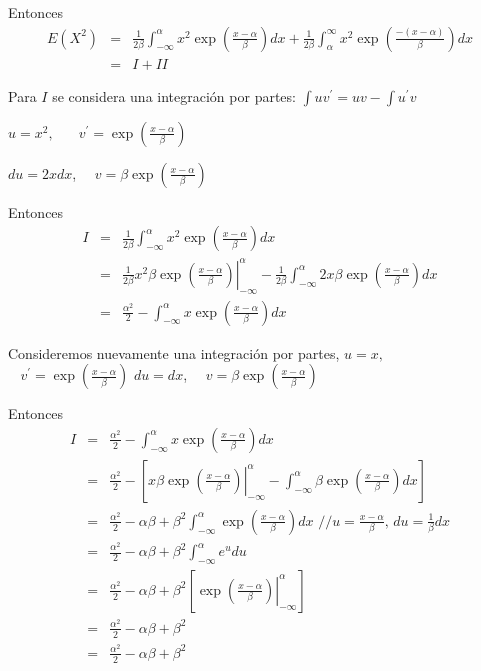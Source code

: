 \begin{i}
Entonces
\begin{eqnarray*}
E(X^{2}) &=&\frac{1}{2\beta }\int_{-\infty }^{\alpha }x^{2}\exp \left( \frac{
x-\alpha }{\beta }\right) dx+\frac{1}{2\beta }\int_{\alpha }^{\infty
}x^{2}\exp \left( \frac{-(x-\alpha )}{\beta }\right) dx \\
&=&I+II
\end{eqnarray*}

Para $I$ se considera una integración por partes: $\int uv^{\prime}=uv-\int u^{\prime }v$

$u=x^{2},$ \ $\ \ \ \ v^{\prime }=\exp \left( \frac{x-\alpha }{\beta}\right) $

$du=2xdx$, \ \ $v=\beta \exp \left( \frac{x-\alpha }{\beta }\right) $

Entonces 
\begin{eqnarray*}
I &=&\frac{1}{2\beta }\int_{-\infty }^{\alpha }x^{2}\exp \left( \frac{
x-\alpha }{\beta }\right) dx \\
&=&\left. \frac{1}{2\beta }x^{2}\beta \exp \left( \frac{x-\alpha }{\beta }
\right) \right\vert _{-\infty }^{\alpha }-\frac{1}{2\beta }\int_{-\infty
}^{\alpha }2x\beta \exp \left( \frac{x-\alpha }{\beta }\right) dx \\
&=&\frac{\alpha ^{2}}{2}-\int_{-\infty }^{\alpha }x\exp \left( \frac{
x-\alpha }{\beta }\right) dx\text{ \ }
\end{eqnarray*}

Consideremos nuevamente una integración por partes,
$u=x,$ \ $\ \ \ \ v^{\prime }=\exp \left( \frac{x-\alpha }{\beta }\right) $
$du=dx$, \ \ $v=\beta \exp \left( \frac{x-\alpha }{\beta }\right) $

Entonces
\begin{eqnarray*}
I &=&\frac{\alpha ^{2}}{2}-\int_{-\infty }^{\alpha }x\exp \left( \frac{
x-\alpha }{\beta }\right) dx\text{ \ } \\
&=&\frac{\alpha ^{2}}{2}-\left[ \left. x\beta \exp \left( \frac{x-\alpha }{
\beta }\right) \right\vert _{-\infty }^{\alpha }-\int_{-\infty }^{\alpha
}\beta \exp \left( \frac{x-\alpha }{\beta }\right) dx\right] \\
&=&\frac{\alpha ^{2}}{2}-\alpha \beta +\beta ^{2}\int_{-\infty }^{\alpha
}\exp \left( \frac{x-\alpha }{\beta }\right) dx\text{ //}u=\frac{x-\alpha }{
\beta }\text{, \ }du=\frac{1}{\beta }dx \\
&=&\frac{\alpha ^{2}}{2}-\alpha \beta +\beta ^{2}\int_{-\infty }^{\alpha
}e^{u}du \\
&=&\frac{\alpha ^{2}}{2}-\alpha \beta +\beta ^{2}\left[ \left. \exp \left( 
\frac{x-\alpha }{\beta }\right) \right\vert _{-\infty }^{\alpha }\right] \\
&=&\frac{\alpha ^{2}}{2}-\alpha \beta +\beta ^{2} \\
&=&\frac{\alpha ^{2}}{2}-\alpha \beta +\beta ^{2}
\end{eqnarray*}


\end{i}
